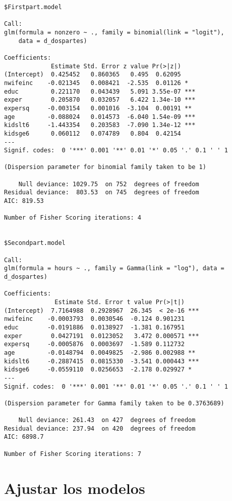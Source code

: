 \documentclass[
  letterpaper,
  DIV=11,
  numbers=noendperiod]{scrreprt}
\begin{document}
\begin{verbatim}
$Firstpart.model

Call:
glm(formula = nonzero ~ ., family = binomial(link = "logit"), 
    data = d_dospartes)

Coefficients:
             Estimate Std. Error z value Pr(>|z|)    
(Intercept)  0.425452   0.860365   0.495  0.62095    
nwifeinc    -0.021345   0.008421  -2.535  0.01126 *  
educ         0.221170   0.043439   5.091 3.55e-07 ***
exper        0.205870   0.032057   6.422 1.34e-10 ***
expersq     -0.003154   0.001016  -3.104  0.00191 ** 
age         -0.088024   0.014573  -6.040 1.54e-09 ***
kidslt6     -1.443354   0.203583  -7.090 1.34e-12 ***
kidsge6      0.060112   0.074789   0.804  0.42154    
---
Signif. codes:  0 '***' 0.001 '**' 0.01 '*' 0.05 '.' 0.1 ' ' 1

(Dispersion parameter for binomial family taken to be 1)

    Null deviance: 1029.75  on 752  degrees of freedom
Residual deviance:  803.53  on 745  degrees of freedom
AIC: 819.53

Number of Fisher Scoring iterations: 4


$Secondpart.model

Call:
glm(formula = hours ~ ., family = Gamma(link = "log"), data = d_dospartes)

Coefficients:
              Estimate Std. Error t value Pr(>|t|)    
(Intercept)  7.7164988  0.2928967  26.345  < 2e-16 ***
nwifeinc    -0.0003793  0.0030546  -0.124 0.901231    
educ        -0.0191886  0.0138927  -1.381 0.167951    
exper        0.0427191  0.0123052   3.472 0.000571 ***
expersq     -0.0005876  0.0003697  -1.589 0.112732    
age         -0.0148794  0.0049825  -2.986 0.002988 ** 
kidslt6     -0.2887415  0.0815330  -3.541 0.000443 ***
kidsge6     -0.0559110  0.0256653  -2.178 0.029927 *  
---
Signif. codes:  0 '***' 0.001 '**' 0.01 '*' 0.05 '.' 0.1 ' ' 1

(Dispersion parameter for Gamma family taken to be 0.3763689)

    Null deviance: 261.43  on 427  degrees of freedom
Residual deviance: 237.94  on 420  degrees of freedom
AIC: 6898.7

Number of Fisher Scoring iterations: 7
\end{verbatim}

\section{Ajustar los modelos}\label{ajustar-los-modelos}
\end{document}
